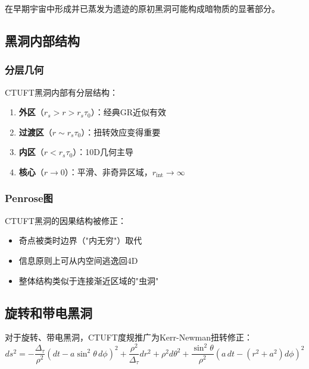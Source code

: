 \begin{proposition}[作为暗物质的遗迹]
在早期宇宙中形成并已蒸发为遗迹的原初黑洞可能构成暗物质的显著部分。
\end{proposition}

\subsection{黑洞内部结构}

\subsubsection{分层几何}

CTUFT黑洞内部有分层结构：
\begin{enumerate}
    \item \textbf{外区}（$r_s > r > r_s\tau_0$）：经典GR近似有效
    \item \textbf{过渡区}（$r \sim r_s\tau_0$）：扭转效应变得重要
    \item \textbf{内区}（$r < r_s\tau_0$）：10D几何主导
    \item \textbf{核心}（$r \to 0$）：平滑、非奇异区域，$r_{\text{int}} \to \infty$
\end{enumerate}

\subsubsection{Penrose图}

CTUFT黑洞的因果结构被修正：
\begin{itemize}
    \item 奇点被类时边界（"内无穷"）取代
    \item 信息原则上可从内空间逃逸回4D
    \item 整体结构类似于连接渐近区域的"虫洞"
\end{itemize}

\subsection{旋转和带电黑洞}

对于旋转、带电黑洞，CTUFT度规推广为Kerr-Newman扭转修正：
\begin{equation}
    ds^2 = -\frac{\Delta_\tau}{\rho^2}\left(dt - a\sin^2\theta \, d\phi\right)^2 + \frac{\rho^2}{\Delta_\tau}dr^2 + \rho^2 d\theta^2 + \frac{\sin^2\theta}{\rho^2}\left(a \, dt - (r^2+a^2)d\phi\right)^2
\end{equation}

